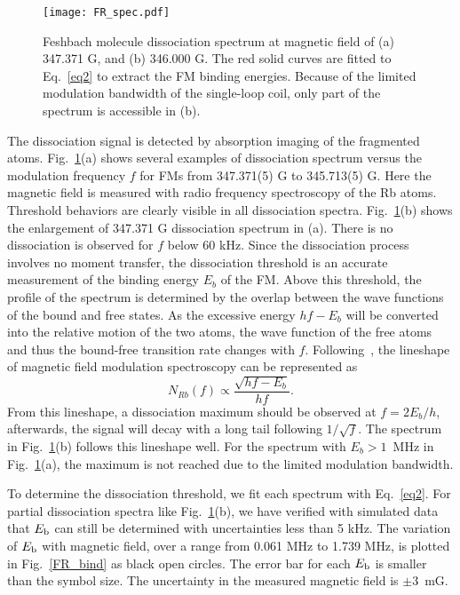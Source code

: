 \begin{figure}[htb]
\begin{center}
\texttt{[image: FR\_spec.pdf]}
\end{center}
\caption[Feshbach molecule dissociation spectrum]{Feshbach molecule dissociation spectrum at magnetic field of (a) 347.371 G, and (b) 346.000 G. The red solid curves are fitted to Eq.~\ref{eq2} to extract the FM binding energies. Because of the limited modulation bandwidth of the single-loop coil, only part of the spectrum is accessible in (b).}
\label{FR_spec}
\end{figure}

The dissociation signal is detected by absorption imaging of the fragmented \Rb atoms. Fig.~\ref{FR_spec}(a) shows several examples of dissociation spectrum versus the modulation frequency $f$ for FMs from 347.371(5) G to 345.713(5) G. Here the magnetic field is measured with radio frequency spectroscopy of the Rb atoms. Threshold behaviors are clearly visible in all dissociation spectra. Fig.~\ref{FR_spec}(b) shows the enlargement of 347.371 G dissociation spectrum in (a). There is no dissociation is observed for $f$ below 60 kHz. Since the dissociation process involves no moment transfer, the dissociation threshold is an accurate measurement of the binding energy $E_b$ of the FM. Above this threshold, the profile of the spectrum is determined by the overlap between the wave functions of the bound and free states. As the excessive energy $hf-E_b$ will be converted into the relative motion of the two atoms, the wave function of the free atoms and thus the bound-free transition rate changes with $f$. Following~\cite{Mohapatra2015}, the lineshape of magnetic field modulation spectroscopy can be represented as
\begin{equation}
N_{Rb}(f) \propto \frac{\sqrt{hf-E_b}}{hf}.
\label{eq2}
\end{equation}
From this lineshape, a dissociation maximum should be observed at $f = 2E_b/h$, afterwards, the signal will decay with a long tail following $1/\sqrt{f}$. The spectrum in Fig.~\ref{FR_spec}(b) follows this lineshape well. For the spectrum with $E_b>1$~MHz in Fig.~\ref{FR_spec}(a), the maximum is not reached due to the limited modulation bandwidth. 

To determine the dissociation threshold, we fit each spectrum with Eq.~\ref{eq2}. For partial dissociation spectra like Fig.~\ref{FR_spec}(b), we have verified with simulated data that $E_{\rm b}$ can still be determined with uncertainties less than 5 kHz. The variation of $E_{\rm b}$ with magnetic field, over a range from 0.061 MHz to 1.739 MHz, is plotted in Fig.~\ref{FR_bind} as black open circles. The error bar for each $E_{\rm b}$ is smaller than the symbol size. The uncertainty in the measured magnetic field is $\pm3$~mG. 

